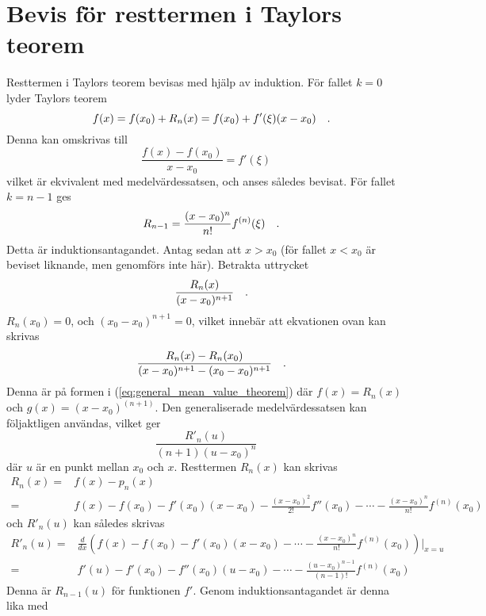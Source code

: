 \section{Bevis för resttermen i Taylors teorem}\label{proof_taylors_theorem}
Resttermen i Taylors teorem bevisas med hjälp av induktion. För fallet \(k=0\) lyder Taylors teorem
\begin{equation}
    f(x)=f(x_0)+R_n(x)=f(x_0)+f'(\xi)(x-x_0)
\quad\mathrm{.}\!\!\!\!\!\!\end{equation} Denna kan omskrivas till
\begin{equation}
    \frac{f(x)-f(x_0)}{x-x_0}=f'(\xi)
\end{equation} vilket är ekvivalent med medelvärdessatsen, och anses således bevisat. För fallet \(k=n-1\) ges
\begin{equation}
    R_{n-1}=\frac{(x-x_0)^n}{n!}f^{(n)}(\xi)
\quad\mathrm{.}\!\!\!\!\!\!\end{equation} Detta är induktionsantagandet. Antag sedan att \(x>x_0\) (för fallet \(x<x_0\) är beviset liknande, men genomförs inte här). Betrakta uttrycket
\begin{equation}
    \frac{R_n(x)}{(x-x_0)^{n+1}}
\quad\mathrm{.}\!\!\!\!\!\!\end{equation} \(R_n(x_0)=0\), och \((x_0-x_0)^{n+1}=0\), vilket innebär att ekvationen ovan kan skrivas
\begin{equation}
    \frac{R_n(x)-R_n(x_0)}{(x-x_0)^{n+1}-(x_0-x_0)^{n+1}}
\quad\mathrm{.}\!\!\!\!\!\!\end{equation} Denna är på formen i (\ref{eq:general_mean_value_theorem}) där \(f(x)=R_n(x)\) och \(g(x)=(x-x_0)^{(n+1)}\). Den generaliserade medelvärdessatsen kan följaktligen användas, vilket ger
\begin{equation}
    \frac{R'_n(u)}{(n+1)(u-x_0)^n}
\end{equation} där \(u\) är en punkt mellan \(x_0\) och \(x\). Resttermen \(R_n(x)\) kan skrivas
\begin{equation}
    \begin{split}
        R_n(x)=&f(x)-p_n(x)\\
        =&f(x)-f(x_0)-f'(x_0)(x-x_0)-\frac{(x-x_0)^2}{2!}f''(x_0)-\cdots-\frac{(x-x_0)^n}{n!}f^{(n)}(x_0)
    \end{split}
\end{equation} och \(R'_n(u)\) kan således skrivas
\begin{equation}
    \begin{split}
        R'_n(u)=&\frac{d}{dx}\left(f(x)-f(x_0)-f'(x_0)(x-x_0)-\cdots-\frac{(x-x_0)^n}{n!}f^{(n)}(x_0)\right)\Bigr|_{x=u}\\
        =&f'(u)-f'(x_0)-f''(x_0)(u-x_0)-\cdots-\frac{(u-x_0)^{n-1}}{(n-1)!}f^{(n)}(x_0)
    \end{split}
\end{equation} Denna är \(R_{n-1}(u)\) för funktionen \(f'\). Genom induktionsantagandet är denna lika med
